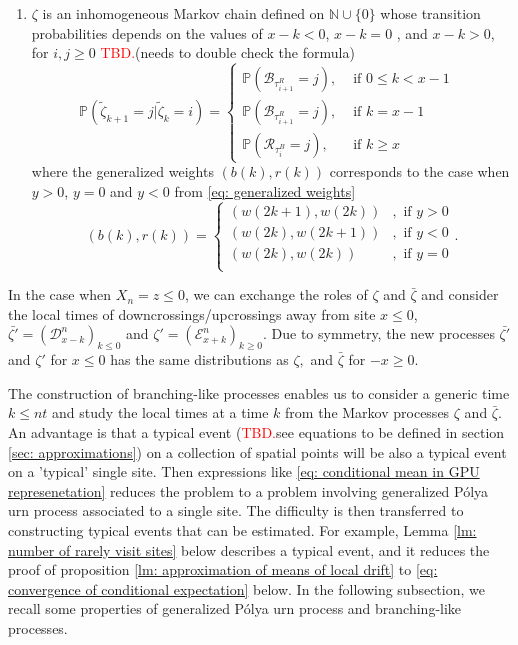 \documentclass[twoside,12pt,a4paper]{article}
\numberwithin{equation}{section}
\newcommand\TBD{\textcolor{red}{TBD.}}
\begin{document}
{\begin{enumerate}
	\item  $\zeta$ is an inhomogeneous Markov chain defined on  $\mathbb{N}\cup\{0\}$ whose transition probabilities depends on the values of $x-k<0$, $x-k = 0$ , and $x-k >0$, for $i,j\geq 0$
	\TBD(needs to double check the formula)
	\begin{equation}\label{eq: transition prob on positive }
		\mathbb{P}\left(\tilde{\zeta}_{k+1}=j \vert \tilde{\zeta}_k =i  \right) = 
		\begin{cases}
		\mathbb{P}\left( \mathcal{B}_{\tau_{i+1}^R} = j \right) ,& \mbox{ if $0 \leq k <  x-1$ }
		\\
		\mathbb{P}\left( \mathcal{B}_{\tau_{i+1}^R} = j \right) ,& \mbox{ if  $k =  x-1$ }
		\\
		\mathbb{P}\left( \mathcal{R}_{\tau_i^B} = j \right) ,& \mbox{ if $k \geq x$ }
		\end{cases}
	\end{equation} where the generalized weights $(b(k), r(k))$ corresponds to the case when $y>0$, $y=0$ and $y<0$ from \eqref{eq: generalized weights}
	$$
	(b(k), r(k)) = \begin{cases}
	(w(2k+1), w(2k)) &,  \text{ if }  y>0 \\
	(w(2k), w(2k+1)) &,  \text{ if }  y<0 \\  
	(w(2k), w(2k)) &,  \text{ if }  y=0 \\ 
\end{cases}.
	$$	 
 \end{enumerate}
In the case when $X_n = z\leq 0$, we can exchange the roles of $\zeta$ and $\bar{\zeta}$ and consider the local times of downcrossings/upcrossings away from site $x\leq 0$,  $\bar{\zeta'}= (\mathcal{D}^{n}_{x-k} )_{k\leq 0}$ and $\zeta'= (\mathcal{E}^{n}_{x+k} )_{k\geq 0}$. Due to symmetry, the new processes $\bar{\zeta'}$ and $\zeta'$ for $x\leq 0$ has the same distributions as $\zeta,$ and $\bar{\zeta}$ for $-x\geq0$.

The construction of branching-like processes enables us to consider a generic time $k\leq nt$ and study the local times at a time $k$ from the Markov processes $\zeta$ and $\bar{\zeta}$. An advantage is that a typical event (\TBD{see equations to be defined in section \ref{sec: approximations}}) on a collection of spatial points will be also a typical event on a 'typical' single site. Then expressions like \eqref{eq: conditional mean in GPU represenetation} reduces the problem to a problem involving generalized P\'{o}lya urn process associated to a single site. The difficulty is then transferred to constructing typical events that can be estimated. For example, Lemma \ref{lm: number of rarely visit sites} below describes a typical event, and it reduces the proof of proposition \ref{lm: approximation of means of local drift} to \eqref{eq: convergence of conditional expectation} below. In the following subsection, we recall some properties of generalized P\'{o}lya urn process and branching-like processes.

}
\end{document}
